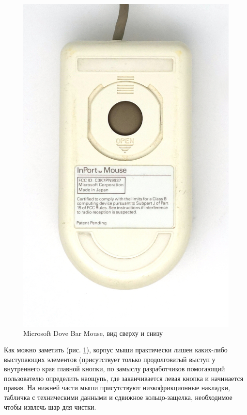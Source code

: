 \documentclass[11pt, a4paper]{article}
\begin{document}
\begin{figure}[h]
    \includegraphics[scale=0.55]{1987_microsoft_dove_bar_mouse/bottom_30.jpg}
    \caption{Microsoft Dove Bar Mouse, вид сверху и снизу}
    \label{fig:MicrosoftDoveBarTopAndBottom}
\end{figure}

Как можно заметить (рис. \ref{fig:MicrosoftDoveBarTopAndBottom}), корпус мыши практически лишен каких-либо выступающих элементов (присутствует только продолговатый выступ у внутреннего края главной кнопки, по замыслу разработчиков помогающий пользователю определить наощупь, где заканчивается левая кнопка и начинается правая. На нижней части мыши присутствуют низкофрикционные накладки, табличка с техническими данными и сдвижное кольцо-защелка, необходимое чтобы извлечь шар для чистки.
\end{document}
